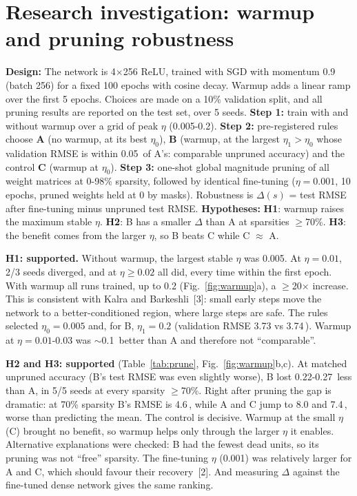 \documentclass[10pt,a4paper]{article}
\newcommand{\A}{\,\text{\AA}}
\begin{document}
\section{Research investigation: warmup and pruning robustness}
\textbf{Design:} The network is 4$\times$256 ReLU, trained with SGD with momentum 0.9 (batch 256) for a fixed 100 epochs with cosine decay. Warmup
adds a linear ramp over the first 5 epochs. Choices are made on a 10\% validation split, and all pruning results are reported on the
test set, over 5 seeds. \textbf{Step 1:} train with and without warmup over a grid of peak $\eta$
(0.005-0.2). \textbf{Step 2:} pre-registered rules choose \textbf{A} (no warmup, at its best $\eta_0$),
\textbf{B} (warmup, at the largest $\eta_1>\eta_0$ whose validation RMSE is within 0.05\A{} of A's: comparable
unpruned accuracy) and the control \textbf{C} (warmup at $\eta_0$). \textbf{Step 3:} one-shot global
magnitude pruning of all weight matrices at 0-98\% sparsity, followed by identical fine-tuning ($\eta=0.001$, 10 epochs,
pruned weights held at 0 by masks). Robustness is $\Delta(s)$ = test RMSE after fine-tuning minus unpruned test RMSE.
\textbf{Hypotheses:} \textbf{H1}: warmup raises the maximum stable $\eta$. \textbf{H2}: B has a smaller $\Delta$ than A at
sparsities $\geq$70\%. \textbf{H3}: the benefit comes from the larger $\eta$, so B beats C while C $\approx$ A.

\textbf{H1: supported.} Without warmup, the largest stable $\eta$ was 0.005. At $\eta=0.01$, 2/3 seeds diverged, and at
$\eta\geq0.02$ all did, every time within the first epoch. With warmup all runs trained, up to 0.2
(Fig.~\ref{fig:warmup}a), a $\geq$20$\times$ increase. This is consistent with Kalra and Barkeshli~[3]: small early steps move the
network to a better-conditioned region, where large steps are safe. The rules selected $\eta_0=0.005$ and, for B,
$\eta_1=0.2$ (validation RMSE 3.73 vs 3.74\A). Warmup at $\eta=0.01$-0.03 was $\sim$0.1\A{} better than A and therefore not
``comparable''.

\textbf{H2 and H3: supported} (Table~\ref{tab:prune}, Fig.~\ref{fig:warmup}b,c). At matched unpruned accuracy
(B's test RMSE was even slightly worse), B lost 0.22-0.27\A{} less than A, in 5/5 seeds at every sparsity $\geq$70\%.
Right after pruning the gap is dramatic: at 70\% sparsity B's RMSE is 4.6\A, while A and C jump to 8.0 and 7.4\A,
worse than predicting the mean. The control is decisive. Warmup at the small $\eta$ (C) brought no benefit,
so warmup helps only through the larger $\eta$ it enables. Alternative explanations were checked:
B had the fewest dead units, so its pruning was not ``free'' sparsity. The fine-tuning $\eta$ (0.001) was
relatively larger for A and C, which should favour their recovery~[2]. And measuring $\Delta$ against the fine-tuned
dense network gives the same ranking.
\end{document}
